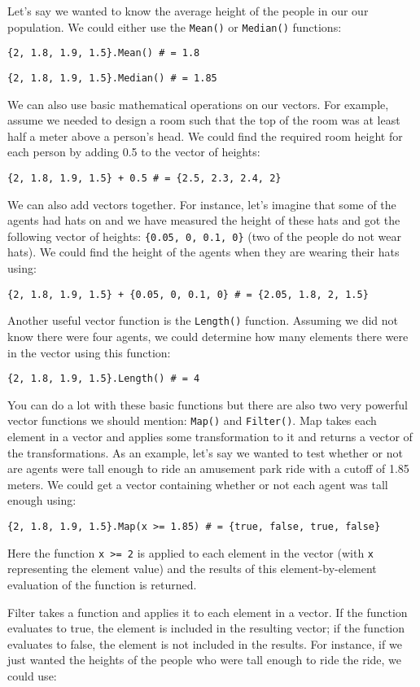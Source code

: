 \documentclass[]{memoir}
\begin{document}
Let's say we wanted to know the average height of the people in our our
population. We could either use the \lstinline!Mean()! or
\lstinline!Median()! functions:

\lstinline!{2, 1.8, 1.9, 1.5}.Mean() # = 1.8!

\lstinline!{2, 1.8, 1.9, 1.5}.Median() # = 1.85!

We can also use basic mathematical operations on our vectors. For
example, assume we needed to design a room such that the top of the room
was at least half a meter above a person's head. We could find the
required room height for each person by adding 0.5 to the vector of
heights:

\lstinline!{2, 1.8, 1.9, 1.5} + 0.5 # = {2.5, 2.3, 2.4, 2}!

We can also add vectors together. For instance, let's imagine that some
of the agents had hats on and we have measured the height of these hats
and got the following vector of heights: \lstinline!{0.05, 0, 0.1, 0}!
(two of the people do not wear hats). We could find the height of the
agents when they are wearing their hats using:

\lstinline!{2, 1.8, 1.9, 1.5} + {0.05, 0, 0.1, 0} # = {2.05, 1.8, 2, 1.5}!

Another useful vector function is the \lstinline!Length()! function.
Assuming we did not know there were four agents, we could determine how
many elements there were in the vector using this function:

\lstinline!{2, 1.8, 1.9, 1.5}.Length() # = 4!

You can do a lot with these basic functions but there are also two very
powerful vector functions we should mention: \lstinline!Map()! and
\lstinline!Filter()!. Map takes each element in a vector and applies
some transformation to it and returns a vector of the transformations.
As an example, let's say we wanted to test whether or not are agents
were tall enough to ride an amusement park ride with a cutoff of 1.85
meters. We could get a vector containing whether or not each agent was
tall enough using:

\lstinline!{2, 1.8, 1.9, 1.5}.Map(x >= 1.85) # = {true, false, true, false}!

Here the function \lstinline!x >= 2! is applied to each element in the
vector (with \lstinline!x! representing the element value) and the
results of this element-by-element evaluation of the function is
returned.

Filter takes a function and applies it to each element in a vector. If
the function evaluates to true, the element is included in the resulting
vector; if the function evaluates to false, the element is not included
in the results. For instance, if we just wanted the heights of the
people who were tall enough to ride the ride, we could use:
\end{document}
